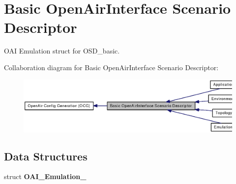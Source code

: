 \section{Basic OpenAirInterface Scenario Descriptor}
\label{group____OSD__basic}
OAI Emulation struct for OSD\_\-basic.  




Collaboration diagram for Basic OpenAirInterface Scenario Descriptor:\nopagebreak
\begin{figure}[H]
\begin{center}
\leavevmode
\includegraphics[width=343pt]{group____OSD__basic}
\end{center}
\end{figure}
\subsection*{Data Structures}
\begin{CompactItemize}
\item 
struct {\bf OAI\_\-Emulation\_\-}
\end{CompactItemize}
